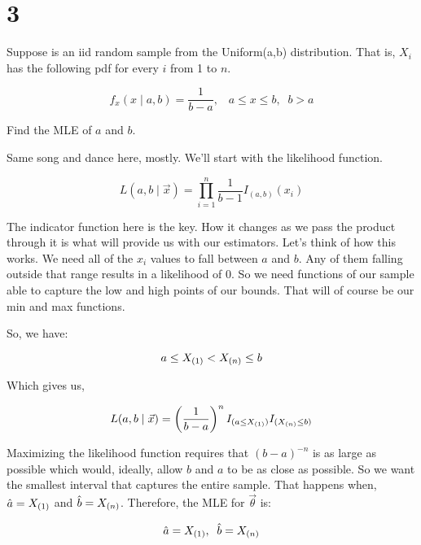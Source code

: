 \section*{3}

Suppose \rs is an iid random sample from the Uniform(a,b) distribution. That is, $X_i$ has the following pdf for every $i$ from 1 to $n$.

\[
	f_x(x \mid a,b) = \frac{1}{b-a}, \;\;\; a \leq x \leq b, \;\; b>a
\]

Find the MLE of $a$ and $b$. 

Same song and dance here, mostly. We'll start with the likelihood function.

\[L(a,b \mid \vec{x}) = \prod_{i=1}^n \frac{1}{b-1} I_{(a,b)}(x_i)\]

The indicator function here is the key. How it changes as we pass the product through it is what will provide us with our estimators. Let's think of how this works. We need all of the $x_i$ values to fall between $a$ and $b$. Any of them falling outside that range results in a likelihood of 0. So we need functions of our sample able to capture the low and high points of our bounds. That will of course be our min and max functions. 

So, we have:

\[a \leq X_{(1)} < X_{(n)} \leq b \]

Which gives us,

\[L(a,b \mid \vec{x}) = \left( \frac{1}{b-a} \right)^n I_{(a \leq X_{(1)})} I_{(X_{(n)} \leq b)} \]

Maximizing the likelihood function requires that $(b-a)^{-n}$ is as large as possible which would, ideally, allow $b$ and $a$ to be as close as possible. So we want the smallest interval that captures the entire sample. That happens when, $\hat{a} = X_{(1)}$ and $\hat{b} = X_{(n)}$. Therefore, the MLE for $\vec{\theta}$ is:

\[\hat{a} = X_{(1)}, \;\; \hat{b} = X_{(n)}\]
